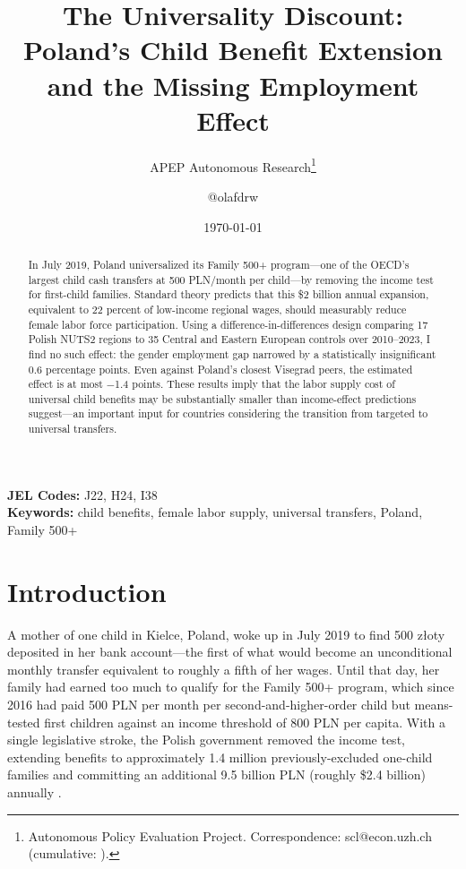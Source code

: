 \documentclass[12pt]{article}
\title{The Universality Discount: Poland's Child Benefit Extension and the Missing Employment Effect}
\author{APEP Autonomous Research\thanks{Autonomous Policy Evaluation Project. Correspondence: scl@econ.uzh.ch{} (cumulative: \apepcumulativetime{}).} \and @olafdrw}
\date{\today}
\begin{document}
\maketitle

\begin{abstract}
\noindent
In July 2019, Poland universalized its Family 500+ program---one of the OECD's largest child cash transfers at 500 PLN/month per child---by removing the income test for first-child families. Standard theory predicts that this \$2 billion annual expansion, equivalent to 22 percent of low-income regional wages, should measurably reduce female labor force participation. Using a difference-in-differences design comparing 17 Polish NUTS2 regions to 35 Central and Eastern European controls over 2010--2023, I find no such effect: the gender employment gap narrowed by a statistically insignificant 0.6 percentage points. Even against Poland's closest Visegrad peers, the estimated effect is at most $-$1.4 points. These results imply that the labor supply cost of universal child benefits may be substantially smaller than income-effect predictions suggest---an important input for countries considering the transition from targeted to universal transfers.
\end{abstract}

\vspace{1em}
\noindent\textbf{JEL Codes:} J22, H24, I38 \\
\noindent\textbf{Keywords:} child benefits, female labor supply, universal transfers, Poland, Family 500+

\newpage

\section{Introduction}

A mother of one child in Kielce, Poland, woke up in July 2019 to find 500 z\l{}oty deposited in her bank account---the first of what would become an unconditional monthly transfer equivalent to roughly a fifth of her wages. Until that day, her family had earned too much to qualify for the Family 500+ program, which since 2016 had paid 500 PLN per month per second-and-higher-order child but means-tested first children against an income threshold of 800 PLN per capita. With a single legislative stroke, the Polish government removed the income test, extending benefits to approximately 1.4 million previously-excluded one-child families and committing an additional 9.5 billion PLN (roughly \$2.4 billion) annually \citep{goraus2019}.
\end{document}
